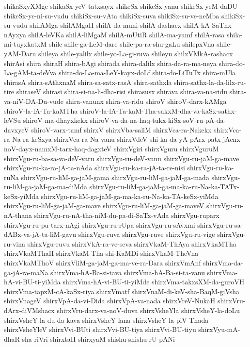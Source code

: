 {shikaSxyXMge
shikaSx-yeV-tatxsayx
shikeSx
shikeSx-yanu
shikeSx-yeM-daDU
shikeSx-ye-ni-su-vudu
shikiSx-su-vAta
shikiSx-suva
shikiSx-su-ve-neMba
shikiSx-su-vudu
shilAMga
shilAMgaH
shilA-da-muni
shilA-dashacx
shilA-kA-SaThx-nAyxya
shilA-leVKa
shilA-liMgaM
shilA-mUtiR
shilA-ma-yamf
shilA-rasa
shila-mi-tuyxkatxM
shile
shile-ga-LeM-dare
shile-pa-ra-shu-gaLu
shilepxVna
shile-yAM-Daru
shileya
shile-yalilx
shile-yo-La-gi-ruva
shileyu
shilxVMkA-rashacx
shirAsi
shira
shiraH
shira-bAgi
shirada
shira-dalilx
shira-da-ra-ma-neya
shira-do-La-gAM-ta-deVva
shira-do-La-ma-LeY-kayx-doLf
shira-do-LiTuTx
shira-mUla
shirasA
shira-sAthxnaM
shira-sa-satx-rasA
shira-sathxla
shira-sathx-la-da-lilx-ru-tire
shiraseV
shirasi
shira-si-na-li-dha-risi
shirasusx
shirava
shira-va-na-ridu
shira-va-niV-DA-Du-vude
shira-vanunx
shira-va-ridu
shiroV
shiroV-darx-kAMga
shiroV-la-lA-Ta-kaMTha
shiroV-la-lA-Ta-kaM-Tha-sakxM-dha-va-kaSx-sathx-leVSu
shiroV-ma-dhayxkekx
shiroV-va-da-na-haq-tukx-kiSx-soV-ru-pA-da-davxyeV
shiroV-varx-tamf
shirxV
shirxVba-saliM
shirxVca-ra-Nakekx
shirxVca-ra-Na-ra-keSxya
shirxVca-ra-Na-vanu
shirxVdeV-shi-ka-da-yA-pArx-patx-jAcnx-noV-dayx-namxM-tarx-haq-dagxteV
shirxVgiri
shirxVguru
shirxVguruM
shirxVgu-ru-ba-sa-va-deV-varu
shirxVgu-ru-deV-vanu
shirxVgu-ru-jaM-ga-mave
shirxVgu-ru-ka-ra-jA-ta-nAda
shirxVgu-ru-ka-ra-jA-ta-re-nisi
shirxVgu-ru-ka-ruNa
shirxVgu-ru-liM-ga-jaM-gama
shirxVgu-ru-liM-ga-jaM-ga-mada
shirxVgu-ru-liM-ga-jaM-ga-ma-diMda
shirxVgu-ru-liM-ga-jaM-ga-ma-ka-ru-Na-ka-TATx-keSx-yiMda
shirxVgu-ru-liM-ga-jaM-ga-ma-ka-ru-Na-ka-TA-keSx-yiMda
shirxVgu-ru-liM-ga-jaM-ga-mave
shirxVgu-ru-liM-ga-jaM-ga-maveV
shirxVgu-ru-nA-thana
shirxVgu-ru-nA-tha-niM-du-pa-di-SaTx-vAda
shirxVgu-ruparx
shirxVgu-ru-pu-tarx-nAgi
shirxVgu-ru-rUpa
shirxVgu-ru-sAvxmi
shirxVgu-ru-sa-dABx-va-jA-ta-liM-gavu
shirxVgu-ruva
shirxVgu-ruve
shirxVgu-ru-vige
shirxVgu-ru-vina
shirxVgu-ruvu
shirxVkA-ra-ve-seva
shirxVkaM-ThAya
shirxVkaMTha
shirxVkaMThaH
shirxVkaM-Tha-shi-KaMDi
shirxVkaM-TheVna
shirxVkaMThoV
shirxVliM-ga-jaM-ga-ma-ve-ra-Dara
shirxVmAnf
shirxVma-da-ga-jA-ra-maNa
shirxVma-hA-Ba-si-tava
shirxVma-hA-Ba-si-ta-vanu
shirxVma-hA-vi-BU-ti-yiMda
shirxVma-hA-vi-BU-ti-yiMde
shirxVma-takxsXM-da-guroVH
shirxVma-tapxM-cA-kaSx-riya
shirxVmatf
shirxVnaM-di-keV-sha-BaqM-giVsha
shirxVnageV
shirxVpA-da-vi-Dida
shirxVpA-va-nada
shirxVreV-NukaH
shirxVru-dArx-diVMshacx
shirxVru-darx-va-noV-duva
shirxVsheYla
shirxVsheY-la-doLu
shirxVsheY-la-du-da-kava
shirxVsheY-lana
shirxVsheY-la-piV-Thada
shirxVsheYleV
shirxVvi-BUti
shirxVvi-BU-tiya
shirxVvi-BU-tiyu
shirxVyu-mA-dhaR-sha-riVri
shirxtaH
shirxyaM
shishu
shishu-rU-pANi
}
